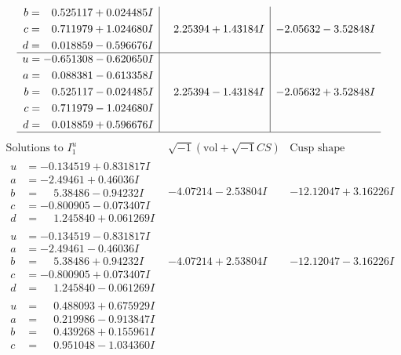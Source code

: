 \documentclass[1p]{elsarticle_modified}
\theoremstyle{definition}
\newcommand{\I}{\sqrt{-1}}
\begin{document}
$$\begin{array}{c|c|c}
\begin{aligned}
b &= \phantom{-}0.525117 + 0.024485 I \\
c &= \phantom{-}0.711979 + 1.024680 I \\
d &= \phantom{-}0.018859 - 0.596676 I\end{aligned}
 & \phantom{-}2.25394 + 1.43184 I & -2.05632 - 3.52848 I \\ \hline\begin{aligned}
u &= -0.651308 - 0.620650 I \\
a &= \phantom{-}0.088381 - 0.613358 I \\
b &= \phantom{-}0.525117 - 0.024485 I \\
c &= \phantom{-}0.711979 - 1.024680 I \\
d &= \phantom{-}0.018859 + 0.596676 I\end{aligned}
 & \phantom{-}2.25394 - 1.43184 I & -2.05632 + 3.52848 I\\
 \hline 
 \end{array}$$\newpage$$\begin{array}{c|c|c}  
\text{Solutions to }I^u_{1}& \I (\text{vol} + \sqrt{-1}CS) & \text{Cusp shape}\\
 \hline 
\begin{aligned}
u &= -0.134519 + 0.831817 I \\
a &= -2.49461 + 0.46036 I \\
b &= \phantom{-}5.38486 - 0.94232 I \\
c &= -0.800905 - 0.073407 I \\
d &= \phantom{-}1.245840 + 0.061269 I\end{aligned}
 & -4.07214 - 2.53804 I & -12.12047 + 3.16226 I \\ \hline\begin{aligned}
u &= -0.134519 - 0.831817 I \\
a &= -2.49461 - 0.46036 I \\
b &= \phantom{-}5.38486 + 0.94232 I \\
c &= -0.800905 + 0.073407 I \\
d &= \phantom{-}1.245840 - 0.061269 I\end{aligned}
 & -4.07214 + 2.53804 I & -12.12047 - 3.16226 I \\ \hline\begin{aligned}
u &= \phantom{-}0.488093 + 0.675929 I \\
a &= \phantom{-}0.219986 - 0.913847 I \\
b &= \phantom{-}0.439268 + 0.155961 I \\
c &= \phantom{-}0.951048 - 1.034360 I \\

\end{aligned}
\end{array}$$
\end{document}
